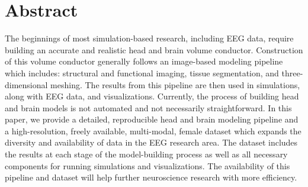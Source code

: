%

\section*{Abstract}

The beginnings of most simulation-based research, including EEG data, require building an accurate and realistic head and brain volume conductor. Construction of this volume conductor generally follows an image-based modeling pipeline which includes: structural and functional imaging, tissue segmentation, and three-dimensional meshing. The results from this pipeline are then used in simulations, along with EEG data, and visualizations. Currently, the process of building head and brain models is not automated and not necessarily straightforward. In this paper, we provide a detailed, reproducible head and brain modeling pipeline and a high-resolution, freely available, multi-modal,  female dataset which expands the diversity and availability of data in the EEG research area. The dataset includes the results at each stage of the model-building process as well as all necessary components for running simulations and visualizations. The availability of this pipeline and dataset will help further neuroscience research with more efficiency.